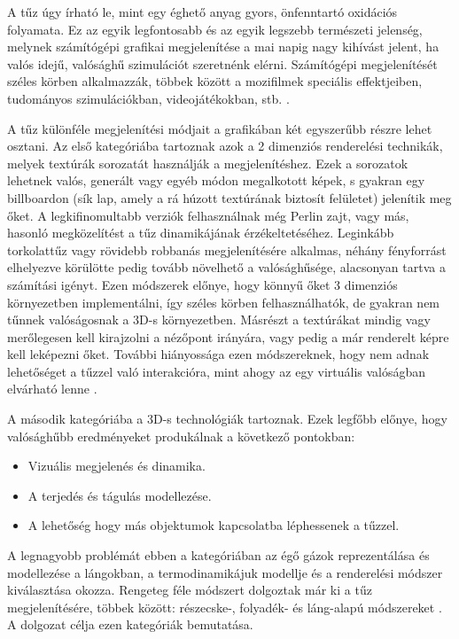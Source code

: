 
A tűz úgy írható le, mint egy éghető anyag gyors, önfenntartó oxidációs folyamata. Ez az egyik legfontosabb és az egyik legszebb természeti jelenség, melynek számítógépi grafikai megjelenítése a mai napig nagy kihívást jelent, ha valós idejű, valósághű szimulációt szeretnénk elérni. Számítógépi megjelenítését széles körben alkalmazzák, többek között a mozifilmek speciális effektjeiben, tudományos szimulációkban, videojátékokban, stb. \cite{steinemannFire}.

A tűz különféle megjelenítési módjait a grafikában két egyszerűbb részre lehet osztani. Az első kategóriába tartoznak azok a 2 dimenziós renderelési technikák, melyek textúrák sorozatát használják a megjelenítéshez. Ezek a sorozatok lehetnek valós, generált vagy egyéb módon megalkotott képek, s gyakran egy billboardon (sík lap, amely a rá húzott textúrának biztosít felületet) jelenítik meg őket. A legkifinomultabb verziók felhasználnak még Perlin zajt, vagy más, hasonló megközelítést a tűz dinamikájának érzékeltetéséhez. Leginkább torkolattűz vagy rövidebb robbanás megjelenítésére alkalmas, néhány fényforrást elhelyezve körülötte pedig tovább növelhető a valósághűsége, alacsonyan tartva a számítási igényt. Ezen módszerek előnye, hogy könnyű őket 3 dimenziós környezetben implementálni, így széles körben felhasználhatók, de gyakran nem tűnnek valóságosnak a 3D-s környezetben. Másrészt a textúrákat mindig vagy merőlegesen kell kirajzolni a nézőpont irányára, vagy pedig a már renderelt képre kell leképezni őket. További hiányossága ezen módszereknek, hogy nem adnak lehetőséget a tűzzel való interakcióra, mint ahogy az egy virtuális valóságban elvárható lenne \cite{steinemannFire}.

A második kategóriába a 3D-s technológiák tartoznak. Ezek legfőbb előnye, hogy valósághűbb eredményeket produkálnak a következő pontokban:
\begin{itemize}
\item Vizuális megjelenés és dinamika.
\item A terjedés és tágulás modellezése.
\item A lehetőség hogy más objektumok kapcsolatba léphessenek a tűzzel.
\end{itemize}
A legnagyobb problémát ebben a kategóriában az égő gázok reprezentálása és modellezése a lángokban, a termodinamikájuk modellje és a renderelési módszer kiválasztása okozza.
Rengeteg féle módszert dolgoztak már ki a tűz megjelenítésére, többek között: részecske-, folyadék- és láng-alapú módszereket \cite{steinemannFire}. A dolgozat célja ezen kategóriák bemutatása.
